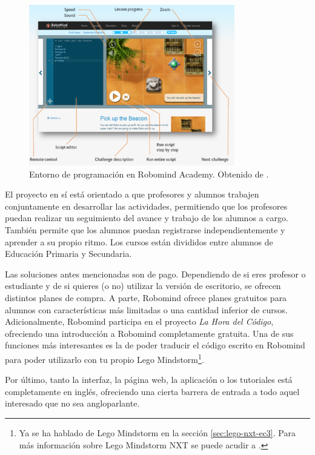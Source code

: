 \begin{figure}[!ht]
	\begin{centering}
		\includegraphics[width=0.8\textwidth]{images/robomind-entorno.png}
			\caption{Entorno de programación en Robomind Academy. Obtenido de \cite{robomind-web}.}
				\label{fig:robomind-entorno}
	\end{centering}
\end{figure}


El proyecto en sí está orientado a que profesores y alumnos trabajen conjuntamente en desarrollar las actividades, permitiendo que los profesores puedan realizar un seguimiento del avance y trabajo de los alumnos a cargo. También permite que los alumnos puedan registrarse independientemente y aprender a su propio ritmo. Los cursos están divididos entre alumnos de Educación Primaria y Secundaria. 

Las soluciones antes mencionadas son {\color{red}de pago}. Dependiendo de si eres profesor o estudiante y de si quieres (o no) utilizar la versión de escritorio, se ofrecen distintos planes de compra. 
A parte, Robomind ofrece planes gratuitos para alumnos con características más limitadas o una cantidad inferior de cursos. Adicionalmente, Robomind participa en el proyecto \emph{La Hora del Código}\cite{hour-of-code}, ofreciendo una introducción a Robomind completamente gratuita. Una de sus funciones más interesantes es la de poder traducir el código escrito en Robomind para poder utilizarlo con tu propio Lego Mindstorm\footnote{Ya se ha hablado de Lego Mindstorm en la sección \ref{sec:lego-nxt-ec3}. Para más información sobre Lego Mindstorm NXT se puede acudir a \cite{lego-mindstorm}.}.

Por último, tanto la interfaz, la página web, la aplicación o los tutoriales está completamente en inglés, ofreciendo una cierta barrera de entrada a todo aquel interesado que no sea angloparlante. 


